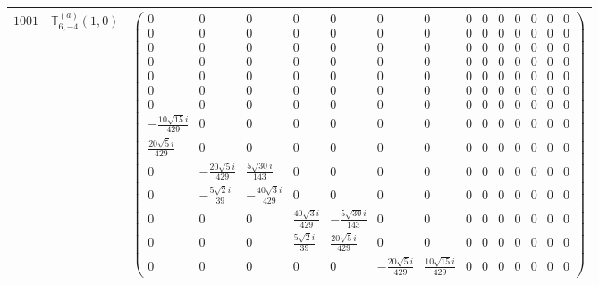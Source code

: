 \documentclass[fleqn,8pt,landscape]{jsarticle}
\begin{document}
\begin{center}
\begin{longtable}{ccc}
$ 1001 $ & $ \mathbb{T}_{6,-4}^{(a)}(1,0) $ & $ \begin{pmatrix} 0 & 0 & 0 & 0 & 0 & 0 & 0 & 0 & 0 & 0 & 0 & 0 & 0 & 0 \\ 0 & 0 & 0 & 0 & 0 & 0 & 0 & 0 & 0 & 0 & 0 & 0 & 0 & 0 \\ 0 & 0 & 0 & 0 & 0 & 0 & 0 & 0 & 0 & 0 & 0 & 0 & 0 & 0 \\ 0 & 0 & 0 & 0 & 0 & 0 & 0 & 0 & 0 & 0 & 0 & 0 & 0 & 0 \\ 0 & 0 & 0 & 0 & 0 & 0 & 0 & 0 & 0 & 0 & 0 & 0 & 0 & 0 \\ 0 & 0 & 0 & 0 & 0 & 0 & 0 & 0 & 0 & 0 & 0 & 0 & 0 & 0 \\ 0 & 0 & 0 & 0 & 0 & 0 & 0 & 0 & 0 & 0 & 0 & 0 & 0 & 0 \\ - \frac{10 \sqrt{15} i}{429} & 0 & 0 & 0 & 0 & 0 & 0 & 0 & 0 & 0 & 0 & 0 & 0 & 0 \\ \frac{20 \sqrt{5} i}{429} & 0 & 0 & 0 & 0 & 0 & 0 & 0 & 0 & 0 & 0 & 0 & 0 & 0 \\ 0 & - \frac{20 \sqrt{5} i}{429} & \frac{5 \sqrt{30} i}{143} & 0 & 0 & 0 & 0 & 0 & 0 & 0 & 0 & 0 & 0 & 0 \\ 0 & - \frac{5 \sqrt{2} i}{39} & - \frac{40 \sqrt{3} i}{429} & 0 & 0 & 0 & 0 & 0 & 0 & 0 & 0 & 0 & 0 & 0 \\ 0 & 0 & 0 & \frac{40 \sqrt{3} i}{429} & - \frac{5 \sqrt{30} i}{143} & 0 & 0 & 0 & 0 & 0 & 0 & 0 & 0 & 0 \\ 0 & 0 & 0 & \frac{5 \sqrt{2} i}{39} & \frac{20 \sqrt{5} i}{429} & 0 & 0 & 0 & 0 & 0 & 0 & 0 & 0 & 0 \\ 0 & 0 & 0 & 0 & 0 & - \frac{20 \sqrt{5} i}{429} & \frac{10 \sqrt{15} i}{429} & 0 & 0 & 0 & 0 & 0 & 0 & 0 \end{pmatrix} $ \\ \hline

\end{longtable}
\end{center}
\end{document}

